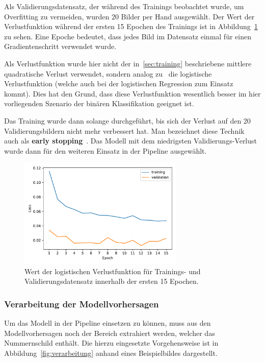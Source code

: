 Als Validierungsdatensatz, der w\"ahrend des Trainings beobachtet wurde,
um Overfitting zu vermeiden, wurden 20 Bilder per Hand ausgew\"ahlt.
Der Wert der Verlustfunktion w\"ahrend der ersten 15 Epochen des Trainings ist in
Abbildung~\ref{fig:training-loss} zu sehen.
Eine Epoche bedeutet, dass jedes Bild im Datensatz einmal f\"ur einen
Gradientenschritt verwendet wurde.

Als Verlustfunktion wurde hier nicht der in~\ref{sec:training} beschriebene
mittlere quadratische Verlust verwendet, sondern analog zu~\cite{image-segmentation}
die logistische Verlustfunktion (welche auch bei der logistischen Regression zum Einsatz kommt).
Dies hat den Grund, dass diese Verlustfunktion wesentlich besser im
hier vorliegenden Szenario der bin\"aren Klassifikation geeignet ist.

Das Training wurde dann solange durchgef\"uhrt, bis sich der Verlust auf den
20 Validierungsbildern nicht mehr verbessert hat. Man bezeichnet diese
Technik auch als \textbf{early stopping}~\cite{Goodfellow-et-al-2016}.
Das Modell mit dem niedrigsten Validierungs-Verlust wurde dann f\"ur
den weiteren Einsatz in der Pipeline ausgew\"ahlt.

\begin{figure}
    \centering
    \includegraphics[width=0.7\textwidth]{abbildungen/training_plot}
    \caption[Trainings- und Validierungsverlust]{Wert der logistischen Verlustfunktion f\"ur Trainings- und Validierungsdatensatz
        innerhalb der ersten 15 Epochen.}
    \label{fig:training-loss}
\end{figure}

\subsubsection{Verarbeitung der Modellvorhersagen}

Um das Modell in der Pipeline einsetzen zu k\"onnen, muss aus den
Modellvorhersagen noch der Bereich extrahiert werden, welcher das
Nummernschild enth\"alt. Die hierzu eingesetzte Vorgehensweise
ist in Abbildung~\ref{fig:verarbeitung} anhand eines Beispielbildes
dargestellt.

